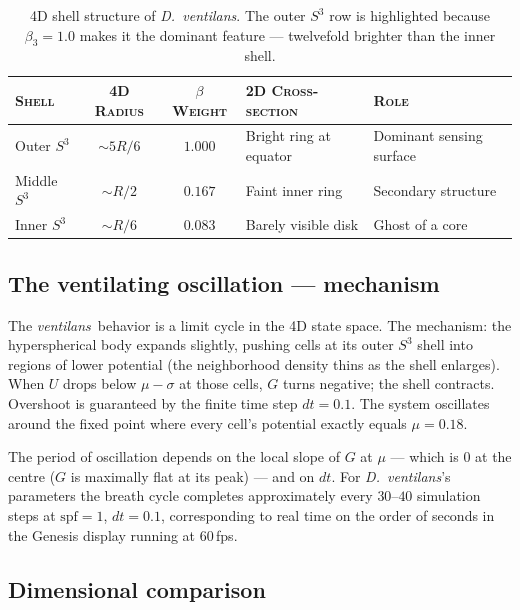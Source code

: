 \documentclass[11pt,a4paper]{article}
\newcommand{\spc}[1]{\textit{#1}}  %
\newcommand{\ventilans}{\textit{ventilans}}
\newcommand{\DV}{\spc{D.\ ventilans}}
\begin{document}
\begin{table}[h!]
\small\sffamily
\renewcommand{\arraystretch}{1.25}
\begin{tabularx}{\linewidth}{@{}l c c >{\raggedright\arraybackslash}X l@{}}
\toprule
\textsc{Shell} & \textsc{4D Radius} & \textsc{$\beta$ Weight} &
\textsc{2D Cross-section} & \textsc{Role}\\
\midrule
\rowcolor{codebg}
Outer $S^{3}$  & $\sim 5R/6$ & $1.000$ & Bright ring at equator      & Dominant sensing surface\\
Middle $S^{3}$ & $\sim R/2$  & $0.167$ & Faint inner ring            & Secondary structure\\
Inner $S^{3}$  & $\sim R/6$  & $0.083$ & Barely visible disk         & Ghost of a core\\
\bottomrule
\end{tabularx}
\caption{\small 4D shell structure of \DV. The outer $S^{3}$ row is
highlighted because $\beta_{3}=1.0$ makes it the dominant feature --- twelvefold brighter than the inner shell.}
\end{table}

\subsection{The ventilating oscillation --- mechanism}

The \ventilans\ behavior is a limit cycle in the 4D state space. The
mechanism: the hyperspherical body expands slightly, pushing cells at its
outer $S^{3}$ shell into regions of lower potential (the neighborhood
density thins as the shell enlarges). When $U$ drops below $\mu-\sigma$
at those cells, $G$ turns negative; the shell contracts. Overshoot is
guaranteed by the finite time step $dt=0.1$. The system oscillates around
the fixed point where every cell's potential exactly equals $\mu=0.18$.

The period of oscillation depends on the local slope of $G$ at $\mu$ ---
which is $0$ at the centre ($G$ is maximally flat at its peak) --- and on
$dt$. For \DV's parameters the breath cycle completes approximately every
$30$--$40$ simulation steps at $\text{spf}=1$, $dt=0.1$, corresponding to
real time on the order of seconds in the Genesis display running at
$60\,$fps.

\subsection{Dimensional comparison}
\end{document}
